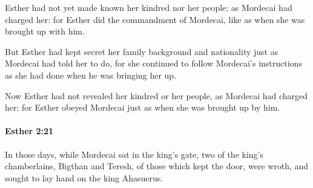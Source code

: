 			\begin{versebox}
					\item[BHS] 
					\item[LXX] 
					\item[ASV] Esther had not yet made known her kindred nor her people; as Mordecai had charged her: for Esther did the commandment of Mordecai, like as when she was brought up with him.
					\item[NIV] But Esther had kept secret her family background and nationality just as Mordecai had told her to do, for she continued to follow Mordecai’s instructions as she had done when he was bringing her up.
					\item[NRSV] Now Esther had not revealed her kindred or her people, as Mordecai had charged her; for Esther obeyed Mordecai just as when she was brought up by him.
			\end{versebox}

		\paragraph{Esther 2:21} %
			\label{ESTHER-2-21}

			In those days, while Mordecai sat in the king’s gate, two of the king’s chamberlains, Bigthan and Teresh, of those which kept the door, were wroth, and sought to lay hand on the king Ahasuerus.

